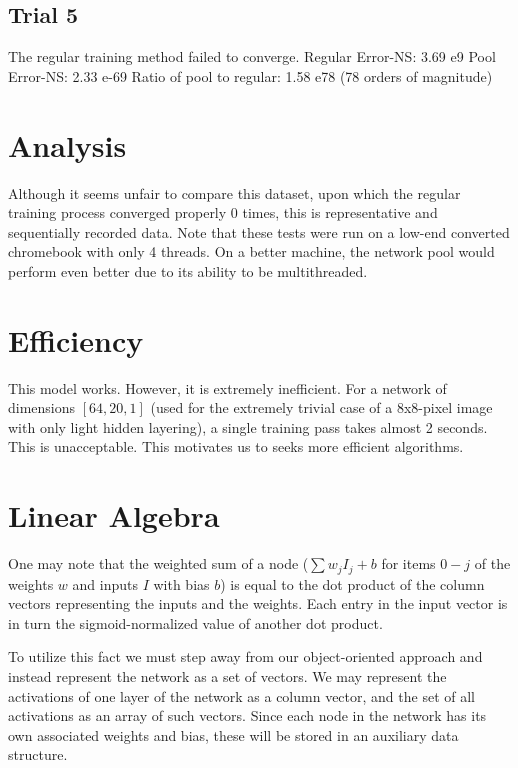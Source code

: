 \documentclass[8pt]{amsart}
\begin{document}
\subsection{Trial 5}

The regular training method failed to converge.
Regular Error-NS: 3.69 e9
Pool Error-NS: 2.33 e-69
Ratio of pool to regular: 1.58 e78 (78 orders of magnitude)

\section{Analysis}

Although it seems unfair to compare this dataset, upon which the regular
training process converged properly 0 times, this is representative and
sequentially recorded data. Note that these tests were run on a low-end
converted chromebook with only 4 threads. On a better machine, the
network pool would perform even better due to its ability to be multithreaded.

\section{Efficiency}

This model works. However, it is extremely inefficient. For a network
of dimensions $[64, 20, 1]$ (used for the extremely trivial case of a
8x8-pixel image with only light hidden layering), a single training pass
takes almost 2 seconds. This is unacceptable. This motivates us to seeks more
efficient algorithms.

\section{Linear Algebra}

One may note that the weighted sum of a node ($\sum{w_j I_j} + b$ for items $0-j$
of the weights $w$ and inputs $I$ with bias $b$) is equal to the dot product
of the column vectors representing the inputs and the weights. Each entry in
the input vector is in turn the sigmoid-normalized value of another dot product.

To utilize this fact we must step away from our object-oriented approach and
instead represent the network as a set of vectors. We may represent the activations
of one layer of the network as a column vector, and the set of all activations as
an array of such vectors. Since each node in the network has its own associated
weights and bias, these will be stored in an auxiliary data structure.
\end{document}
